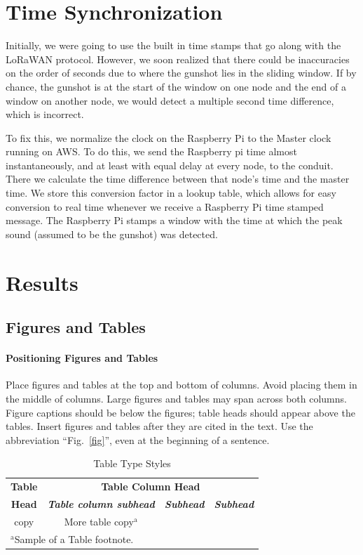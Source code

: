 \documentclass[conference]{IEEEtran}
\begin{document}
\section{Time Synchronization}
Initially, we were going to use the built in time stamps that go along with the LoRaWAN protocol. However, we soon realized that there could be inaccuracies on the order of seconds due to where the gunshot lies in the sliding window. If by chance, the gunshot is at the start of the window on one node and the end of a window on another node, we would detect a multiple second time difference, which is incorrect. 

To fix this, we normalize the clock on the Raspberry Pi to the Master clock running on AWS. To do this, we send the Raspberry pi time almost instantaneously, and at least with equal delay at every node, to the conduit. There we calculate the time difference between that node’s time and the master time. We store this conversion factor in a lookup table, which allows for easy conversion to real time whenever we receive a Raspberry Pi time stamped message. The Raspberry Pi stamps a window with the time at which the peak sound (assumed to be the gunshot) was detected.

\section{Results}

\subsection{Figures and Tables}
\paragraph{Positioning Figures and Tables} Place figures and tables at the top and 
bottom of columns. Avoid placing them in the middle of columns. Large 
figures and tables may span across both columns. Figure captions should be 
below the figures; table heads should appear above the tables. Insert 
figures and tables after they are cited in the text. Use the abbreviation 
``Fig.~\ref{fig}'', even at the beginning of a sentence.

\begin{table}[htbp]
\caption{Table Type Styles}
\begin{center}
\begin{tabular}{|c|c|c|c|}
\hline
\textbf{Table}&\multicolumn{3}{|c|}{\textbf{Table Column Head}} \\
\cline{2-4} 
\textbf{Head} & \textbf{\textit{Table column subhead}}& \textbf{\textit{Subhead}}& \textbf{\textit{Subhead}} \\
\hline
copy& More table copy$^{\mathrm{a}}$& &  \\
\hline
\multicolumn{4}{l}{$^{\mathrm{a}}$Sample of a Table footnote.}
\end{tabular}
\label{tab1}
\end{center}
\end{table}
\end{document}
